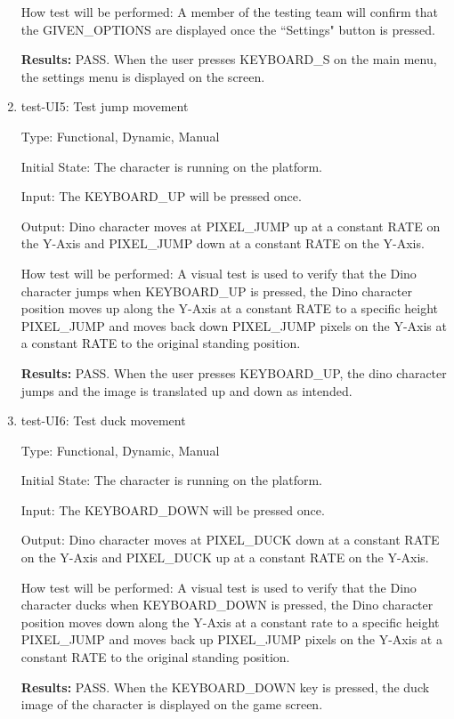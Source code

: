 \documentclass[12pt, titlepage]{article}
\begin{document}
\begin{enumerate}
How test will be performed: A member of the testing team will confirm that the GIVEN\_OPTIONS are displayed once the ``Settings" button is pressed.

\textbf{Results:} PASS. When the user presses KEYBOARD\_S on the main menu, the settings menu is displayed on the screen.

\item{test-UI5: Test jump movement\\}

Type: Functional, Dynamic, Manual
					
Initial State: The character is running on the platform.
					
Input: The KEYBOARD\_UP will be pressed once.
					
Output: Dino character moves at PIXEL\_JUMP up at a constant RATE on the Y-Axis and PIXEL\_JUMP down at a constant RATE on the Y-Axis.
					
How test will be performed: A visual test is used to verify that the Dino character jumps when KEYBOARD\_UP is pressed, the Dino character position moves up along the Y-Axis at a constant RATE to a specific height PIXEL\_JUMP and moves back down PIXEL\_JUMP pixels on the Y-Axis at a constant RATE to the original standing position.

\textbf{Results:} PASS. When the user presses KEYBOARD\_UP, the dino character jumps and the image is translated up and down as intended.

\item{test-UI6: Test duck movement\\}

Type: Functional, Dynamic, Manual
					
Initial State: The character is running on the platform.
					
Input: The KEYBOARD\_DOWN will be pressed once.
					
Output: Dino character moves at PIXEL\_DUCK down at a constant RATE on the Y-Axis and PIXEL\_DUCK up at a constant RATE on the Y-Axis.
					
How test will be performed: A visual test is used to verify that the Dino character ducks when KEYBOARD\_DOWN is pressed, the Dino character position moves down along the Y-Axis at a constant rate to a specific height PIXEL\_JUMP and moves back up PIXEL\_JUMP pixels on the Y-Axis at a constant RATE to the original standing position.

\textbf{Results:} PASS. When the KEYBOARD\_DOWN key is pressed, the duck image of the character is displayed on the game screen.


\end{enumerate}
\end{document}
